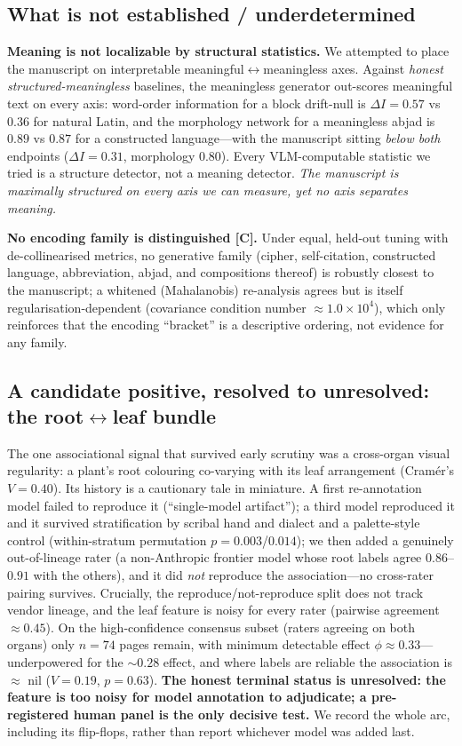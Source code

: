 \documentclass[11pt]{article}
\newcommand{\grade}[1]{{\small\textbf{[#1]}}}
\begin{document}
\subsection{What is not established / underdetermined}
\textbf{Meaning is not localizable by structural statistics.} We attempted to place
the manuscript on interpretable meaningful$\leftrightarrow$meaningless axes. Against
\emph{honest structured-meaningless} baselines, the meaningless generator out-scores
meaningful text on every axis: word-order information for a block drift-null is
$\Delta I = 0.57$ vs $0.36$ for natural Latin, and the morphology network for a
meaningless abjad is $0.89$ vs $0.87$ for a constructed language---with the manuscript
sitting \emph{below both} endpoints ($\Delta I = 0.31$, morphology $0.80$). Every
VLM-computable statistic we tried is a structure detector, not a meaning detector.
\emph{The manuscript is maximally structured on every axis we can measure, yet no axis
separates meaning.}

\textbf{No encoding family is distinguished \grade{C}.} Under equal, held-out tuning
with de-collinearised metrics, no generative family (cipher, self-citation,
constructed language, abbreviation, abjad, and compositions thereof) is robustly
closest to the manuscript; a whitened (Mahalanobis) re-analysis agrees but is itself
regularisation-dependent (covariance condition number $\approx 1.0\times10^{4}$),
which only reinforces that the encoding ``bracket'' is a descriptive ordering, not
evidence for any family.

\subsection{A candidate positive, resolved to unresolved: the root$\leftrightarrow$leaf bundle}
The one associational signal that survived early scrutiny was a cross-organ visual
regularity: a plant's root colouring co-varying with its leaf arrangement (Cram\'er's
$V=0.40$). Its history is a cautionary tale in miniature. A first re-annotation model
failed to reproduce it (``single-model artifact''); a third model reproduced it and it
survived stratification by scribal hand and dialect and a palette-style control
(within-stratum permutation $p=0.003$/$0.014$); we then added a genuinely
out-of-lineage rater (a non-Anthropic frontier model whose root labels agree
$0.86$--$0.91$ with the others), and it did \emph{not} reproduce the association---no
cross-rater pairing survives. Crucially, the reproduce/not-reproduce split does not
track vendor lineage, and the leaf feature is noisy for every rater (pairwise
agreement $\approx 0.45$). On the high-confidence consensus subset (raters agreeing on
both organs) only $n=74$ pages remain, with minimum detectable effect $\phi\approx
0.33$---underpowered for the $\sim 0.28$ effect, and where labels are reliable the
association is $\approx$ nil ($V=0.19$, $p=0.63$). \textbf{The honest terminal status
is unresolved: the feature is too noisy for model annotation to adjudicate; a
pre-registered human panel is the only decisive test.} We record the whole arc,
including its flip-flops, rather than report whichever model was added last.
\end{document}
